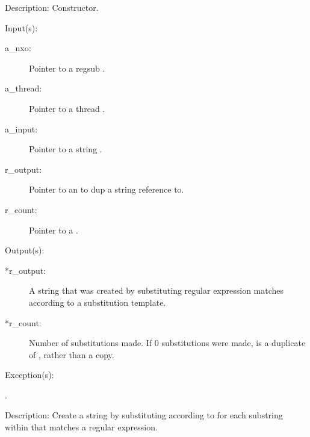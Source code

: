 \begin{capi}
\begin{capilist}
\begin{description}
		\end{description}
	\item[Description: ]
		Constructor.
	\end{capilist}
\label{nxo_regsub_subst}
	\begin{capilist}
	\item[Input(s): ]
		\begin{description}\item[]
		\item[a\_nxo: ]
			Pointer to a regsub .
		\item[a\_thread: ]
			Pointer to a thread .
		\item[a\_input: ]
			Pointer to a string .
		\item[r\_output: ]
			Pointer to an  to dup a string reference
			to.
		\item[r\_count: ]
			Pointer to a .
		\end{description}
	\item[Output(s): ]
		\begin{description}\item[]
		\item[*r\_output: ]
			A string that was created by substituting regular
			expression matches according to a substitution template.
		\item[*r\_count: ]
			Number of substitutions made.  If 0 substitutions were
			made,  is a duplicate of
			, rather than a copy.
		\end{description}
	\item[Exception(s): ]
		\begin{description}\item[]
		\item[.]
		\end{description}
	\item[Description: ]
		Create a string by substituting according to 
		for each substring within  that matches a regular
		expression.


\end{capilist}
\end{capi}
